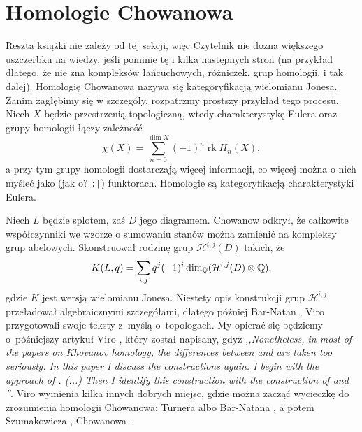 
\section{Homologie Chowanowa}
\label{sec:khovanov}%

Reszta książki nie zależy od tej sekcji, więc Czytelnik nie dozna większego uszczerbku na wiedzy, jeśli pominie tę i kilka następnych stron (na przykład dlatego, że nie zna kompleksów łańcuchowych, różniczek, grup homologii, i tak dalej).
Homologię Chowanowa nazywa się kategoryfikacją wielomianu Jonesa.
Zanim zagłębimy się w szczegóły, rozpatrzmy prostszy przykład tego procesu.
Niech $X$ będzie przestrzenią topologiczną, wtedy charakterystykę Eulera oraz grupy homologii łączy zależność
\begin{equation}
    \chi(X) = \sum_{n = 0}^{\dim X} (-1)^n \operatorname{rk} H_n(X),
\end{equation}
a przy tym grupy homologii dostarczają więcej informacji, co więcej można o nich myśleć jako (jak o? \texttt{:|}) funktorach.
Homologie są kategoryfikacją charakterystyki Eulera.

Niech $L$ będzie splotem, zaś $D$ jego diagramem.
Chowanow \cite{khovanov2000} odkrył, że całkowite współczynniki we wzorze o sumowaniu stanów można zamienić na kompleksy grup abelowych.
Skonstruował rodzinę grup $\mathcal H^{i, j}(D)$ takich, że
\begin{equation}
    K(L, q) = \sum_{i, j} q^j (-1)^i \dim_{\mathbb Q} (\mathcal H^{i, j}(D) \otimes \mathbb Q),
\end{equation}
gdzie $K$ jest wersją wielomianu Jonesa.
Niestety opis konstrukcji grup $\mathcal H^{i, j}$ przeładował algebraicznymi szczegółami, dlatego później Bar-Natan \cite{barnatan2002}, Viro \cite{viro2002} przygotowali swoje teksty z~myślą o~topologach.
%
%
My opierać się będziemy o~późniejszy artykuł Viro \cite{viro2004}, który został napisany, gdyż \emph{,,Nonetheless, in most of the papers on Khovanov homology, the differences between \cite{barnatan2002} and \cite{viro2002} are taken too seriously. In this paper I discuss the constructions again. I begin with the approach of \cite{viro2002}. (...) Then I identify this construction with the construction of \cite{barnatan2002} and \cite{khovanov2000}''}.
Viro \cite{viro2004} wymienia kilka innych dobrych miejsc, gdzie można zacząć wycieczkę do zrozumienia homologii Chowanowa: Turnera \cite{turner2017} albo Bar-Natana \cite{barnatan2002}, a potem Szumakowicza \cite{shumakovitch2012}, Chowanowa \cite{khovanov2000}.
%
%
%
%

